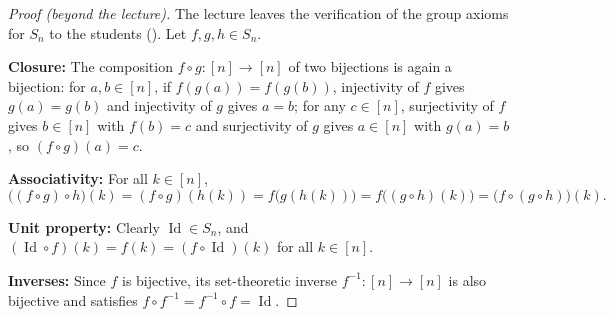 \begin{content}

\begin{proof}[Proof (beyond the lecture)]
The lecture leaves the verification of the group axioms for $S_n$ to the students (). Let $f, g, h \in S_n$.

\textbf{Closure:} The composition $f \circ g \colon [n] \to [n]$ of two bijections is again a bijection: for $a, b \in [n]$, if $f(g(a)) = f(g(b))$, injectivity of $f$ gives $g(a) = g(b)$ and injectivity of $g$ gives $a = b$; for any $c \in [n]$, surjectivity of $f$ gives $b \in [n]$ with $f(b) = c$ and surjectivity of $g$ gives $a \in [n]$ with $g(a) = b$, so $(f \circ g)(a) = c$.

\textbf{Associativity:} For all $k \in [n]$,
\[
\bigl((f \circ g) \circ h\bigr)(k) = (f \circ g)(h(k)) = f\bigl(g(h(k))\bigr) = f\bigl((g \circ h)(k)\bigr) = \bigl(f \circ (g \circ h)\bigr)(k).
\]

\textbf{Unit property:} Clearly $\operatorname{Id} \in S_n$, and $(\operatorname{Id} \circ f)(k) = f(k) = (f \circ \operatorname{Id})(k)$ for all $k \in [n]$.

\textbf{Inverses:} Since $f$ is bijective, its set-theoretic inverse $f^{-1} \colon [n] \to [n]$ is also bijective and satisfies $f \circ f^{-1} = f^{-1} \circ f = \operatorname{Id}$.
\end{proof}


\end{content}

